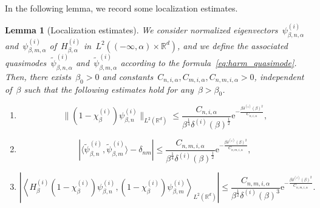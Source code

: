 \documentclass[10pt]{article}
\newcommand{\e}{\mathrm{e}}
\newcommand{\R}{\mathbb{R}}
\newcommand{\1}{\mathbbm 1}
\newcommand{\deltai}{\delta^{(i)}}
\newtheorem{lemma}{Lemma}
\begin{document}
    In the following lemma, we record some localization estimates.
    \begin{lemma}[Localization estimates]
        We consider normalized eigenvectors~$\psi_{\beta,n,\alpha}^{(i)}$ and~$\psi_{\beta,m,\alpha}^{(i)}$ of~$H^{(i)}_{\beta,\alpha}$ in~$L^2((-\infty,\alpha)\times \R^d)$, and we define the associated quasimodes~$\widetilde\psi_{\beta,n,\alpha}^{(i)}$ and~$\widetilde\psi_{\beta,m,\alpha}^{(i)}$ according to the formula~\eqref{eq:harm_quasimode}.
        Then, there exists~$\beta_0>0$ and constants~$C_{n,i,\alpha},C_{m,i,\alpha},C_{n,m,i,\alpha}>0$, independent of~$\beta$ such that the following estimates hold for any~$\beta>\beta_0$.
        \begin{enumerate}[]
            \item{\begin{equation}\label{eq:loc_eqa}\|(1-\chi_\beta^{(i)})\psi_{\beta,n}^{(i)}\|_{L^2(\R^d)} \leq \frac{C_{n,i,\alpha}}{\beta^{\frac14}\deltai(\beta)^{\frac12}}\e^{-\frac{\beta\deltai(\beta)^2}{C_{n,i,\alpha}}},\end{equation}}
            \item{\begin{equation}\label{eq:loc_eqb}\left|\langle \widetilde\psi_{\beta,n}^{(i)},\widetilde\psi_{\beta,m}^{(i)}\rangle-\delta_{nm}\right| \leq  \frac{C_{n,m,i,\alpha}}{\beta^{\frac14}\deltai(\beta)^{\frac12}}\e^{-\frac{\beta\deltai(\beta)^2}{C_{n,m,i,\alpha}}},\end{equation}}
            \item{\begin{equation}\label{eq:loc_eqc}\left|\left\langle H_\beta^{(i)}(1-\chi_\beta^{(i)})\psi_{\beta,n}^{(i)},(1-\chi_\beta^{(i)})\psi_{\beta,m}^{(i)}\right\rangle_{L^2(\R^d)}\right|\leq \frac{C_{n,m,i,\alpha}}{\beta^{\frac12}\deltai(\beta)^{3}}\e^{-\frac{\beta\deltai(\beta)^2}{C_{n,m,i,\alpha}}}.\end{equation}}
        \end{enumerate}
        
    \end{lemma}
\end{document}
